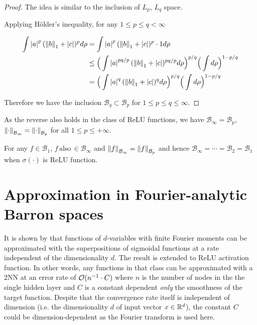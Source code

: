 
\begin{proof}

The idea is similar to the inclusion of $L_p$, $L_q$ space.

Applying Hölder's inequality, for any $1 \leq p \leq q < \infty$

\begin{align*}
    \int \left| a \right|^p (\left\| b \right\|_1 + \left| c \right|)^p d\rho
     & = \int \left| a \right|^p (\left\| b \right\|_1 + \left| c \right|)^p \cdot 1 d\rho                                                    \\
     & \leq \Big(\int \left| a \right|^{pq/p} (\left\| b \right\|_1 + \left| c \right|)^{pq/p} d\rho \Big)^{p/q} \Big(\int d\rho\Big)^{1-p/q} \\
     & = \Big(\int \left| a \right|^q (\left\| b \right\|_1 + \left| c \right|)^q d\rho \Big)^{p/q} \Big(\int d\rho\Big)^{1-p/q}
\end{align*}

Therefore we have the inclusion $\mathcal{B}_{q} \subset \mathcal{B}_p$ for $1
    \leq p \leq q \leq \infty$.
\end{proof}

As the reverse also holds in the class of ReLU functions,  we have
$\mathcal{B}_{\infty} = \mathcal{B}_p$, $\left\| {\cdot} \right\|_{\mathcal{B}_{\infty}} =
    \left\| {\cdot} \right\|_{\mathcal{B}_{p}}$  for all $1 \leq p \leq +\infty$.

\begin{proposition}
    \label{lamma:equivalence_barron_space}

    For any $f \in \mathcal{B}_1$, $f
        \,\text{also}\, \in \mathcal{B}_{\infty}$ and $\left\| {f} \right\|_{\mathcal{B}_{\infty}} =
        \left\| {f} \right\|_{\mathcal{B}_{p}}$ and hence $ \mathcal{B}_{\infty} = \cdots =
        \mathcal{B}_{2} = \mathcal{B}_1$ when $\sigma(\cdot)$ is ReLU function.
\end{proposition}

\section{Approximation in Fourier-analytic Barron spaces}
\label{sec:spectral_norm}

It is shown by \cite{barronUniversalApproximationBounds1993} that functions of
$d$-variables with finite Fourier moments can be approximated with the
superpositions of sigmoidal functions at a rate independent of the
dimensionality $d$. The result is extended to ReLU activation function. In other
words, any functions in that class can be approximated with a 2NN at an error
rate of $\mathcal{O}(n^{-1} \cdot C)$ where $n$ is the number of nodes in the the
single hidden layer and $C$ is a constant dependent \textit{only} the smoothness
of the target function. Despite that the convergence rate itself is independent
of dimension (i.e. the dimensionality $d$ of input vector $x\in\mathbb{R}^d$), the
constant $C$ could be dimension-dependent as the Fourier transform is used here.


